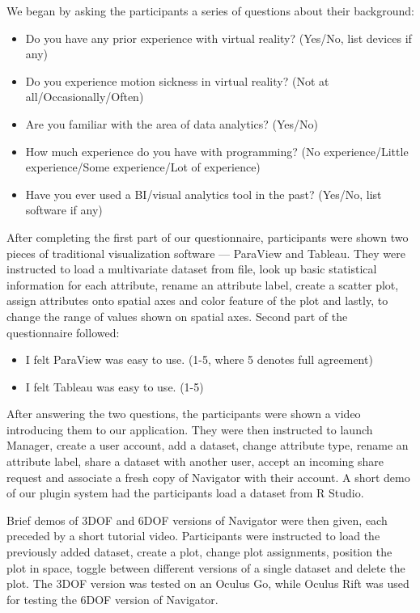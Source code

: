 \documentclass[thesis=M,english,hidelinks]{FITthesisXE}[2012/06/26]
\begin{document}
We began by asking the participants a series of questions about their background:

\begin{itemize}
\item Do you have any prior experience with virtual reality? (Yes/No, list devices if any)
\item Do you experience motion sickness in virtual reality? (Not at all/Occasionally/Often)
\item Are you familiar with the area of data analytics? (Yes/No)
\item How much experience do you have with programming? (No experience/Little experience/Some experience/Lot of experience)
\item Have you ever used a BI/visual analytics tool in the past? (Yes/No, list software if any)
\end{itemize}

After completing the first part of our questionnaire, participants were shown two pieces of traditional visualization software --- ParaView and Tableau. They were instructed to load a multivariate dataset from file, look up basic statistical information for each attribute, rename an attribute label, create a scatter plot, assign attributes onto spatial axes and color feature of the plot and lastly, to change the range of values shown on spatial axes. Second part of the questionnaire followed:

\begin{itemize}
\item I felt ParaView was easy to use. (1-5, where 5 denotes full agreement)
\item I felt Tableau was easy to use. (1-5)
\end{itemize}

After answering the two questions, the participants were shown a video introducing them to our application. They were then instructed to launch Manager, create a user account, add a dataset, change attribute type, rename an attribute label, share a dataset with another user, accept an incoming share request and associate a fresh copy of Navigator with their account. A short demo of our plugin system had the participants load a dataset from R Studio.

Brief demos of 3DOF and 6DOF versions of Navigator were then given, each preceded by a short tutorial video. Participants were instructed to load the previously added dataset, create a plot, change plot assignments, position the plot in space, toggle between different versions of a single dataset and delete the plot. The 3DOF version was tested on an Oculus Go, while Oculus Rift was used for testing the 6DOF version of Navigator.
\end{document}
